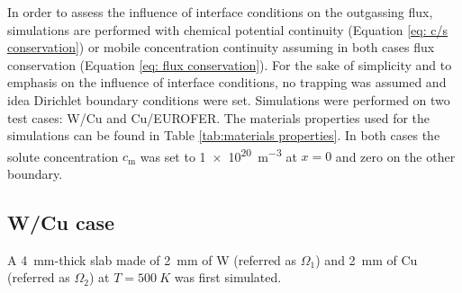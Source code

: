
In order to assess the influence of interface conditions on the outgassing flux, simulations are performed with chemical potential continuity (Equation \ref{eq: c/s conservation}) or mobile concentration continuity assuming in both cases flux conservation (Equation \ref{eq: flux conservation}).
For the sake of simplicity and to emphasis on the influence of interface conditions, no trapping was assumed and idea Dirichlet boundary conditions were set.
Simulations were performed on two test cases: W/Cu and Cu/EUROFER.
The materials properties used for the simulations can be found in Table \ref{tab:materials properties}.
In both cases the solute concentration $c_\mathrm{m}$ was set to \SI{1e20}{m^{-3}} at $x=0$
 and zero on the other boundary.


\subsection{W/Cu case}
A \SI{4}{mm}-thick slab made of \SI{2}{mm} of W (referred as $\Omega_1$) and \SI{2}{mm} of Cu (referred as $\Omega_2$)  at $T=\SI{500}{K}$ was first simulated.



